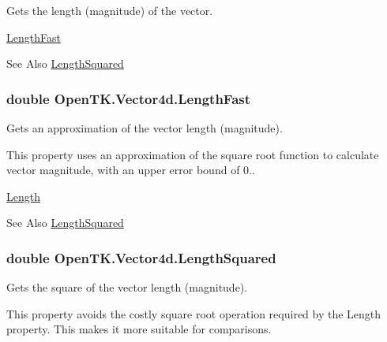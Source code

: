 Gets the length (magnitude) of the vector. 

\hyperlink{struct_open_t_k_1_1_vector4d_a2d8389c0eab7152b136e96a89d9c6d19}{Length\-Fast} \begin{DoxySeeAlso}{See Also}
\hyperlink{struct_open_t_k_1_1_vector4d_a359d864d15d2f2fd790fd2577bb04ec1}{Length\-Squared}


\end{DoxySeeAlso}
\hypertarget{struct_open_t_k_1_1_vector4d_a2d8389c0eab7152b136e96a89d9c6d19}{
\subsubsection[{Length\-Fast}]{\setlength{\rightskip}{0pt plus 5cm}double Open\-T\-K.\-Vector4d.\-Length\-Fast\hspace{0.3cm}{\ttfamily [get]}}}\label{struct_open_t_k_1_1_vector4d_a2d8389c0eab7152b136e96a89d9c6d19}


Gets an approximation of the vector length (magnitude). 

This property uses an approximation of the square root function to calculate vector magnitude, with an upper error bound of 0.. 

\hyperlink{struct_open_t_k_1_1_vector4d_ab9f920535e4630430c8b2a6affcdb6a4}{Length} \begin{DoxySeeAlso}{See Also}
\hyperlink{struct_open_t_k_1_1_vector4d_a359d864d15d2f2fd790fd2577bb04ec1}{Length\-Squared}


\end{DoxySeeAlso}
\hypertarget{struct_open_t_k_1_1_vector4d_a359d864d15d2f2fd790fd2577bb04ec1}{
\subsubsection[{Length\-Squared}]{\setlength{\rightskip}{0pt plus 5cm}double Open\-T\-K.\-Vector4d.\-Length\-Squared\hspace{0.3cm}{\ttfamily [get]}}}\label{struct_open_t_k_1_1_vector4d_a359d864d15d2f2fd790fd2577bb04ec1}


Gets the square of the vector length (magnitude). 

This property avoids the costly square root operation required by the Length property. This makes it more suitable for comparisons. 

